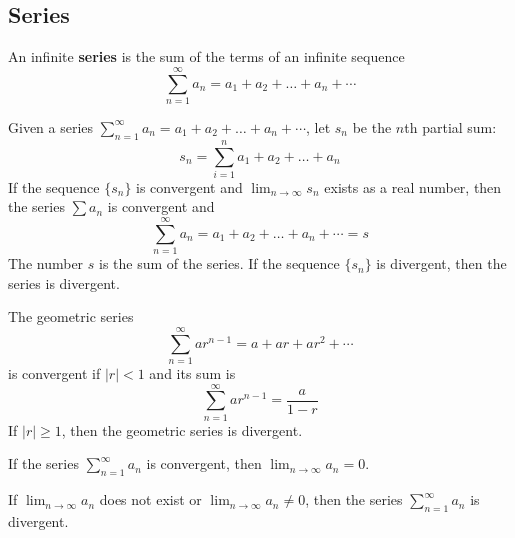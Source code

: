 \subsection{Series}
An infinite \textbf{series} is the sum of the terms of an infinite sequence
\[\sum_{n=1}^{\infty}a_n=a_1+a_2+\dots+a_n+\cdots\]
\begin{definition}
    Given a series \(\sum_{n=1}^{\infty}a_n=a_1+a_2+\dots+a_n+\cdots\), let
    \(s_n\) be the \(n\)th partial sum:
    \[s_n=\sum_{i=1}^n a_1+a_2+\dots+a_n\]
    If the sequence \(\{s_n\}\) is convergent and \(\lim_{n\to\infty}s_n\)
    exists as a real number, then the series \(\sum a_n\) is convergent and
    \[\sum_{n=1}^{\infty}a_n=a_1+a_2+\dots+a_n+\cdots=s\]
    The number \(s\) is the sum of the series.
    If the sequence \(\{s_n\}\) is divergent, then the series is divergent.
\end{definition}
The geometric series
\[\sum_{n=1}^\infty ar^{n-1}=a+ar+ar^2+\cdots\] is convergent if \(|r|<1\) and
its sum is
\[\sum_{n=1}^\infty ar^{n-1}=\frac{a}{1-r}\]
If \(|r|\geq 1\), then the geometric series is divergent.
\begin{theorem}
    If the series \(\sum_{n=1}^{\infty}a_n\) is convergent, then
    \(\lim_{n\to\infty}a_n=0\).
\end{theorem}
\begin{theorem}
    If \(\lim_{n\to\infty}a_n\) does not exist or
    \(\lim_{n\to\infty}a_n\neq0\), then the series \(\sum_{n=1}^\infty a_n\)
    is divergent.
\end{theorem}